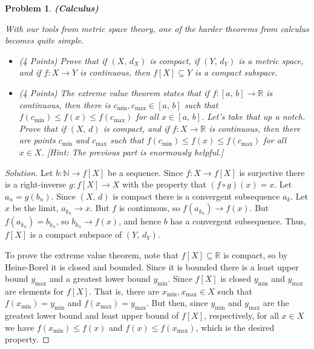 \documentclass{article}
\theoremstyle{normal}
\newtheorem{problem}{Problem}
\begin{document}
    \begin{problem}
        \textbf{(Calculus)}
        \par\hfill\par
        With our tools from metric space theory, one of the harder theorems
        from calculus becomes quite simple.
        \begin{itemize}
            \item (4 Points) Prove that if $(X,\,d_{X})$ is compact, if
                $(Y,\,d_{Y})$ is a metric space, and if $f:X\rightarrow{Y}$ is
                continuous, then $f[X]\subseteq{Y}$ is a compact subspace.
            \item (4 Points) The extreme value theorem states that if
                $f:[a,\,b]\rightarrow\mathbb{R}$ is continuous, then there is
                $c_{\textrm{min}},c_{\textrm{max}}\in[a,\,b]$ such that
                $f(c_{\textrm{min}})\leq{f}(x)\leq{f}(c_{\textrm{max}})$ for
                all $x\in[a,\,b]$. Let's take that up a notch. Prove that if
                $(X,\,d)$ is compact, and if $f:X\rightarrow\mathbb{R}$ is
                continuous, then there are points $c_{\textrm{min}}$ and
                $c_{\textrm{max}}$ such that
                $f(c_{\textrm{min}})\leq{f}(x)\leq{f}(c_{\textrm{max}})$ for
                all $x\in{X}$. [Hint: The previous part is enormously helpful.]
        \end{itemize}
    \end{problem}
    \color{black}
    \begin{proof}[Solution]
        Let $b:\mathbb{N}\rightarrow{f}[X]$ be a sequence. Since
        $f:X\rightarrow{f}[X]$ is surjective there is a right-inverse
        $g:f[X]\rightarrow{X}$ with the property that
        $(f\circ{g})(x)=x$. Let $a_{n}=g(b_{n})$. Since $(X,\,d)$ is compact
        there is a convergent subsequence $a_{k}$. Let $x$ be the limit,
        $a_{k_{n}}\rightarrow{x}$. But $f$ is continuous, so
        $f(a_{k_{n}})\rightarrow{f}(x)$. But
        $f(a_{k_{n}})=b_{k_{n}}$, so $b_{k_{n}}\rightarrow{f}(x)$, and hence
        $b$ has a convergent subsequence. Thus, $f[X]$ is a compact subspace
        of $(Y,\,d_{Y})$.
        \par\hfill\par
        To prove the extreme value theorem, note that
        $f[X]\subseteq\mathbb{R}$ is compact, so by Heine-Borel it is closed
        and bounded. Since it is bounded there is a least upper bound
        $y_{\textrm{max}}$ and a greatest lower bound $y_{\textrm{min}}$. Since
        $f[X]$ is closed $y_{\textrm{min}}$ and $y_{\textrm{max}}$ are elements
        for $f[X]$. That is, there are $x_{\textrm{min}},x_{\textrm{max}}\in{X}$
        such that $f(x_{\textrm{min}})=y_{\textrm{min}}$ and
        $f(x_{\textrm{max}})=y_{\textrm{max}}$. But then, since
        $y_{\textrm{min}}$ and $y_{\textrm{max}}$ are the greatest lower bound
        and least upper bound of $f[X]$, respectively, for all $x\in{X}$ we
        have $f(x_{\textrm{min}})\leq{f}(x)$ and
        $f(x)\leq{f}(x_{\textrm{max}})$, which is the desired property.
    \end{proof}
\end{document}
